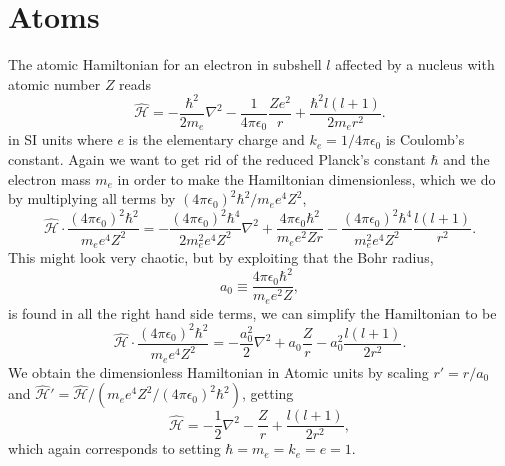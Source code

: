 \section{Atoms}
The atomic Hamiltonian for an electron in subshell $l$ affected by a nucleus with atomic number $Z$ reads
\begin{equation}
\hat{\mathcal{H}}=-\frac{\hbar^2}{2m_e}\nabla^2-\frac{1}{4\pi\epsilon_0}\frac{Ze^2}{r}+\frac{\hbar^2l(l+1)}{2m_er^2}.
\label{eq:HamiltonianAtomic}
\end{equation}
in SI units where $e$ is the elementary charge and $k_e=1/4\pi\epsilon_0$ is Coulomb's constant. Again we want to get rid of the reduced Planck's constant $\hbar$ and the electron mass $m_e$ in order to make the Hamiltonian dimensionless, which we do by multiplying all terms by $(4\pi\epsilon_0)^2\hbar^2/m_ee^4Z^2$,
\begin{equation}
\hat{\mathcal{H}}\cdot\frac{(4\pi\epsilon_0)^2\hbar^2}{m_ee^4Z^2}=-\frac{(4\pi\epsilon_0)^2\hbar^4}{2m_e^2e^4Z^2}\nabla^2+\frac{4\pi\epsilon_0\hbar^2}{m_ee^2Zr}-\frac{(4\pi\epsilon_0)^2\hbar^4}{m_e^2e^4Z^2}\frac{l(l+1)}{r^2}.
\end{equation}
This might look very chaotic, but by exploiting that the Bohr radius,
\begin{equation}
a_0\equiv\frac{4\pi\epsilon_0\hbar^2}{m_ee^2Z},
\end{equation}
is found in all the right hand side terms, we can simplify the Hamiltonian to be
\begin{equation}
\hat{\mathcal{H}}\cdot\frac{(4\pi\epsilon_0)^2\hbar^2}{m_ee^4Z^2}=-\frac{a_0^2}{2}\nabla^2+a_0\frac{Z}{r}-a_0^2\frac{l(l+1)}{2r^2}.
\end{equation}
We obtain the dimensionless Hamiltonian in Atomic units by scaling  $r'=r/a_0$ and $\hat{\mathcal{H}}'=\hat{\mathcal{H}}/(m_ee^4Z^2/(4\pi\epsilon_0)^2\hbar^2)$, getting
\begin{equation}
\hat{\mathcal{H}}=-\frac{1}{2}\nabla^2-\frac{Z}{r}+\frac{l(l+1)}{2r^2},
\end{equation}
which again corresponds to setting $\hbar=m_e=k_e=e=1$.
